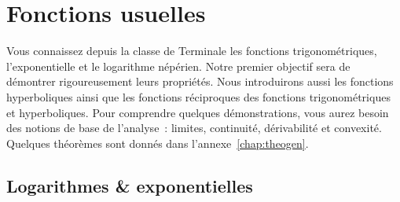 \chapter{Fonctions usuelles}
\label{chap:fonctionsusuelles}
\minitoc
\minilof
\minilot
%
Vous connaissez depuis la classe de Terminale les fonctions trigonométriques, l’exponentielle et le logarithme népérien. Notre premier objectif sera de démontrer rigoureusement leurs propriétés. Nous introduirons aussi les fonctions hyperboliques ainsi que les fonctions réciproques des fonctions trigonométriques et hyperboliques. Pour comprendre quelques démonstrations, vous aurez besoin des notions de base de l’analyse~: limites, continuité, dérivabilité et convexité. Quelques théorèmes sont donnés dans l'annexe~\ref{chap:theogen}.
%
\section{Logarithmes \& exponentielles}
\label{sec:chap1-logetexp}
%
